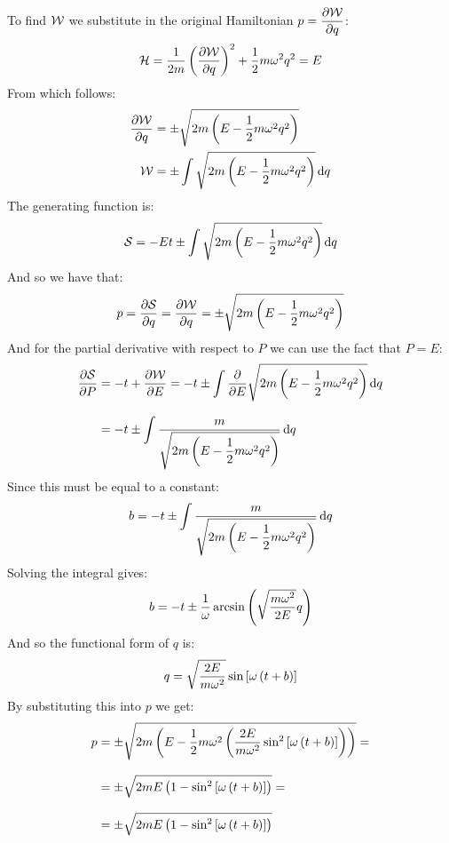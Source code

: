 To find $\mathcal{W}$ we substitute in the original Hamiltonian $p = \pdv{\hamch}{q}$:
\begin{equation}
  \hamfun = \dfrac{1}{2m}\brackets{\pdv{\hamch}{q}}^2 + \dfrac{1}{2}m\omega^2q^2 = E
\end{equation}
From which follows:
\begin{equation}
  \begin{split}
    \pdv{\hamch}{q} &= \pm \sqrt{2m\brackets{E - \dfrac{1}{2}m\omega^2q^2}}\\
    \hamch &= \pm \int  \sqrt{2m\brackets{E - \dfrac{1}{2}m\omega^2q^2}} \dd{q}
  \end{split}
\end{equation}
The generating function is:
\begin{equation}
  \mathcal{S} = -Et \pm \int  \sqrt{2m\left(E - \dfrac{1}{2}m\omega^2q^2\right)} \dd{q}
\end{equation}
And so we have that:
\begin{equation}
  p = \pdv{\action}{q} = \pdv{\hamch}{q} = \pm \sqrt{2m\brackets{E - \dfrac{1}{2}m\omega^2q^2}}
\end{equation}
And for the partial derivative with respect to $P$ we can use the fact that $P=E$:
\begin{equation}
  \begin{split}
    \pdv{\action}{P} &= -t + \pdv{\hamch}{E} = -t \pm \int \pdv{}{E} \sqrt{2m\brackets{E - \dfrac{1}{2}m\omega^2q^2}} \dd{q}\\[8pt]
      &= -t \pm \int \dfrac{m}{\sqrt{2m\brackets{E - \dfrac{1}{2}m\omega^2q^2}}} \dd{q}
  \end{split}
\end{equation}
Since this must be equal to a constant:
\begin{equation}
  b = -t \pm \int \dfrac{m}{\sqrt{2m\left(E - \dfrac{1}{2}m\omega^2q^2\right)}} \dd{q}
\end{equation}
Solving the integral gives:
\begin{equation}
  b = -t \pm \dfrac{1}{\omega} \arcsin \left(\sqrt{\dfrac{m\omega^2}{2E}}q\right)
\end{equation}
And so the functional form of $q$ is:
\begin{equation}
  q = \sqrt{\dfrac{2E}{m\omega^2}} \sin \left[\omega\left( t + b\right)\right]
\end{equation}
By substituting this into $p$ we get:
\begin{equation}
  \begin{split}
    p &= \pm \sqrt{2m\left(E - \dfrac{1}{2}m\omega^2 \left(\dfrac{2E}{m\omega^2} \sin^2 \left[\omega\left( t + b\right)\right]\right)\right)}=\\[8pt]
    &= \pm \sqrt{2mE\left(1 -  \sin^2 \left[\omega\left( t + b\right)\right]\right)}=\\[8pt]
    &= \pm \sqrt{2mE\left(1 -  \sin^2 \left[\omega\left( t + b\right)\right]\right)}
  \end{split}
\end{equation}
